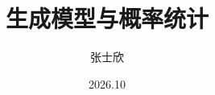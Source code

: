 \makeatletter
{}
\makeatother
\usepackage{beamerthemegenai}
\graphicspath{{figures/}{../shared/figures/}{../../figures/}}

\title{生成模型与概率统计}
\author{张士欣}
\date{2026.10}
\renewcommand{\titlefigure}{cover_probability_flow.pdf}
\renewcommand*{\titleurl}{github.com/refraction-ray/free-energy-to-llms}

